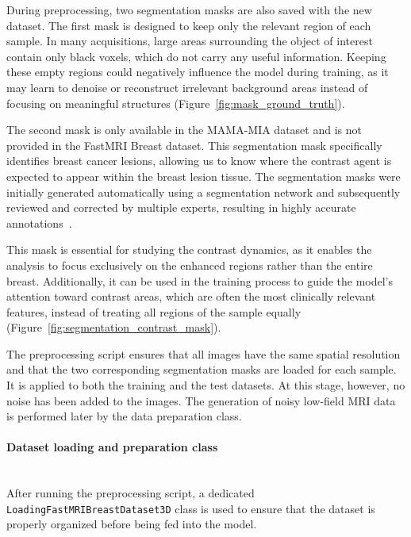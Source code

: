 \documentclass[12pt]{article}
\begin{document}
During preprocessing, two segmentation masks are also saved with the new dataset. The first mask is designed to keep only
the relevant region of each sample. In many acquisitions, large areas surrounding the object of interest contain only black voxels,
which do not carry any useful information. Keeping these empty regions could negatively influence the model during training, as it may learn to denoise
or reconstruct irrelevant background areas instead of focusing on meaningful structures (Figure~\ref{fig:mask_ground_truth}).
\vspace{0.5cm}

The second mask is only available in the MAMA-MIA dataset and is not provided in the FastMRI Breast dataset. This segmentation mask specifically
identifies breast cancer lesions, allowing us to know where the contrast agent is expected to appear within the breast lesion tissue.
The segmentation masks were initially generated automatically using a segmentation network and subsequently reviewed and corrected by multiple experts, resulting in highly accurate annotations~\cite{Mamamia}.
\vspace{0.5cm}

This mask is essential for studying the contrast dynamics, as it enables the analysis to focus exclusively on the enhanced regions rather
than the entire breast. Additionally, it can be used in the training process to guide the model's attention toward contrast
areas, which are often the most clinically relevant features, instead of treating all regions of the sample equally (Figure~\ref{fig:segmentation_contrast_mask}).
\vspace{0.5cm}

The preprocessing script ensures that all images have the same spatial resolution and that the two corresponding segmentation masks are loaded for each sample. 
It is applied to both the training and the test datasets. 
At this stage, however, no noise has been added to the images. 
The generation of noisy low-field MRI data is performed later by the data preparation class.

\paragraph{Dataset loading and preparation class}
\mbox{}\\
After running the preprocessing script, a dedicated \texttt{LoadingFastMRIBreastDataset3D} class is used to ensure that the dataset is properly organized before being fed into the model.
\vspace{0.5cm}
\end{document}
